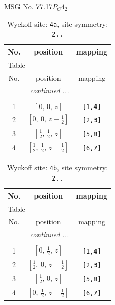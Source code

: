 \documentclass[fleqn,8pt]{jsarticle}
\begin{document}
\setcounter{MaxMatrixCols}{32}

\renewcommand{\tablename}{Table~}
\renewcommand{\figurename}{Figure~}
\begin{center}
\LARGE
MSG No. 77.17\quad$P_{C}4_{2}$
\end{center}
\renewcommand{\arraystretch}{1.2}
\begin{longtable}{ccc}
\caption{Wyckoff site: {\tt 4a}, site symmetry: {\tt 2..}}
 \\
 \hline \hline
No. & position & mapping \\ \hline \endfirsthead

\multicolumn{2}{l}{\tablename\ \thetable{}} \\
 \hline \hline
No. & position & mapping \\ \hline \endhead

 \hline \hline
\multicolumn{2}{r}{\footnotesize\it continued ...} \\ \endfoot

 \hline \hline
\multicolumn{2}{r}{} \\ \endlastfoot

1 & $\left[ 0,\, 0,\, z \right]$ & {\tt [1,4]} \\ \hline
2 & $\left[ 0,\, 0,\, z + \frac{1}{2} \right]$ & {\tt [2,3]} \\ \hline
3 & $\left[ \frac{1}{2},\, \frac{1}{2},\, z \right]$ & {\tt [5,8]} \\ \hline
4 & $\left[ \frac{1}{2},\, \frac{1}{2},\, z + \frac{1}{2} \right]$ & {\tt [6,7]} \\
\end{longtable}
\renewcommand{\arraystretch}{1.2}
\begin{longtable}{ccc}
\caption{Wyckoff site: {\tt 4b}, site symmetry: {\tt 2..}}
 \\
 \hline \hline
No. & position & mapping \\ \hline \endfirsthead

\multicolumn{2}{l}{\tablename\ \thetable{}} \\
 \hline \hline
No. & position & mapping \\ \hline \endhead

 \hline \hline
\multicolumn{2}{r}{\footnotesize\it continued ...} \\ \endfoot

 \hline \hline
\multicolumn{2}{r}{} \\ \endlastfoot

1 & $\left[ 0,\, \frac{1}{2},\, z \right]$ & {\tt [1,4]} \\ \hline
2 & $\left[ \frac{1}{2},\, 0,\, z + \frac{1}{2} \right]$ & {\tt [2,3]} \\ \hline
3 & $\left[ \frac{1}{2},\, 0,\, z \right]$ & {\tt [5,8]} \\ \hline
4 & $\left[ 0,\, \frac{1}{2},\, z + \frac{1}{2} \right]$ & {\tt [6,7]} \\
\end{longtable}
\end{document}
